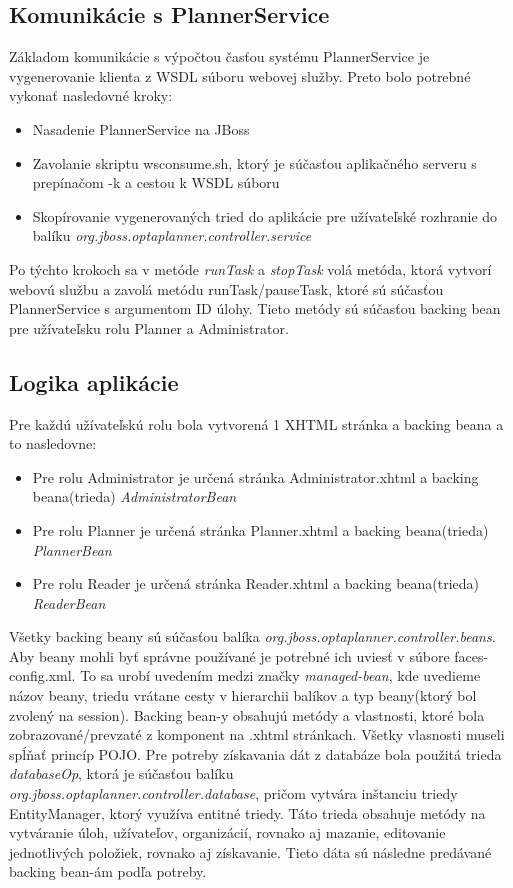 \subsection{Komunikácie s PlannerService}
Základom komunikácie s výpočtou časťou systému PlannerService je vygenerovanie klienta z WSDL súboru webovej služby. Preto bolo potrebné vykonať nasledovné kroky:
\begin{itemize}
\item Nasadenie PlannerService na JBoss
\item Zavolanie skriptu wsconsume.sh, ktorý je súčasťou aplikačného serveru s prepínačom -k a cestou k WSDL súboru
\item Skopírovanie vygenerovaných tried do aplikácie pre užívateľské rozhranie do balíku \emph{org.jboss.optaplanner.controller.service}
\end{itemize}
Po týchto krokoch sa v metóde \emph{runTask} a \emph{stopTask} volá metóda, ktorá vytvorí webovú službu a zavolá metódu runTask/pauseTask, ktoré sú súčasťou PlannerService s argumentom ID úlohy. Tieto metódy sú súčasťou backing bean pre užívateľsku rolu Planner a Administrator.


\subsection{Logika aplikácie}
Pre každú užívateľskú rolu bola vytvorená 1 XHTML stránka a backing beana a to nasledovne:
\begin{itemize}
\item Pre rolu Administrator je určená stránka Administrator.xhtml a backing beana(trieda) \emph{AdministratorBean}
\item Pre rolu Planner je určená stránka Planner.xhtml a backing beana(trieda) \emph{PlannerBean}
\item Pre rolu Reader je určená stránka Reader.xhtml a backing beana(trieda) \emph{ReaderBean}
\end{itemize}
Všetky backing beany sú súčasťou balíka \emph{org.jboss.optaplanner.controller.beans}. Aby beany mohli byť správne používané je potrebné ich uviesť v súbore faces-config.xml. To sa urobí uvedením medzi značky \emph{managed-bean}, kde uvedieme názov beany, triedu vrátane cesty v hierarchii balíkov a typ beany(ktorý bol zvolený na session). Backing bean-y obsahujú metódy a vlastnosti, ktoré bola zobrazované/prevzaté z komponent na .xhtml stránkach. Všetky vlasnosti museli spĺňať princíp POJO. Pre potreby získavania dát z databáze bola použitá trieda \emph{databaseOp}, ktorá je súčasťou balíku \\\emph{org.jboss.optaplanner.controller.database}, pričom vytvára inštanciu triedy EntityManager, ktorý využíva entitné triedy. Táto trieda obsahuje metódy na vytváranie úloh, užívateľov, organizácií, rovnako aj mazanie, editovanie jednotlivých položiek, rovnako aj získavanie. Tieto dáta sú následne predávané backing bean-ám podľa potreby.


